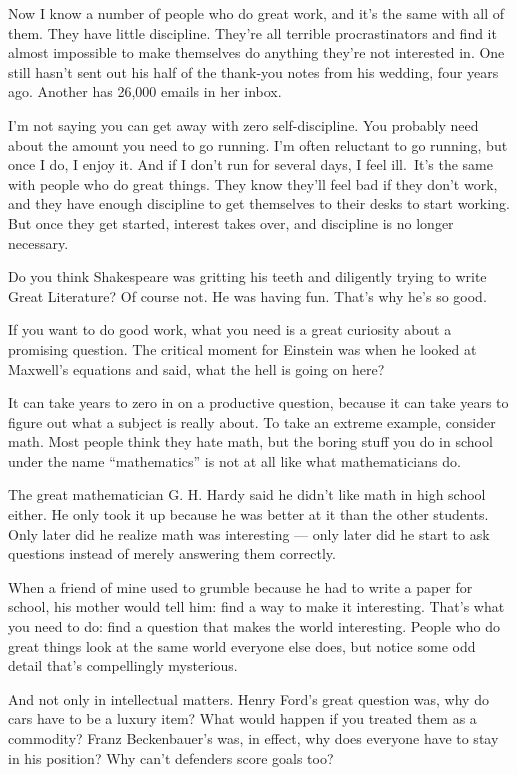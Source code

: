 Now I know a number of people who do great work, and it's the same with
all of them. They have little discipline. They're all terrible
procrastinators and find it almost impossible to make themselves do
anything they're not interested in. One still hasn't sent out his half
of the thank-you notes from his wedding, four years ago. Another has
26,000 emails in her inbox.

I'm not saying you can get away with zero self-discipline. You probably
need about the amount you need to go running. I'm often reluctant to go
running, but once I do, I enjoy it. And if I don't run for several days,
I feel ill.~It's the same with people who do great things. They know
they'll feel bad if they don't work, and they have enough discipline to
get themselves to their desks to start working. But once they get
started, interest takes over, and discipline is no longer necessary.

Do you think Shakespeare was gritting his teeth and diligently trying to
write Great Literature? Of course not. He was having fun. That's why
he's so good.

If you want to do good work, what you need is a great curiosity about a
promising question. The critical moment for Einstein was when he looked
at Maxwell's equations and said, what the hell is going on here?

It can take years to zero in on a productive question, because it can
take years to figure out what a subject is really about. To take an
extreme example, consider math. Most people think they hate math, but
the boring stuff you do in school under the name ``mathematics'' is not
at all like what mathematicians do.

The great mathematician G. H. Hardy said he didn't like math in high
school either. He only took it up because he was better at it than the
other students. Only later did he realize math was interesting --- only
later did he start to ask questions instead of merely answering them
correctly.

When a friend of mine used to grumble because he had to write a paper
for school, his mother would tell him: find a way to make it
interesting. That's what you need to do: find a question that makes the
world interesting. People who do great things look at the same world
everyone else does, but notice some odd detail that's compellingly
mysterious.

And not only in intellectual matters. Henry Ford's great question was,
why do cars have to be a luxury item? What would happen if you treated
them as a commodity? Franz Beckenbauer's was, in effect, why does
everyone have to stay in his position? Why can't defenders score goals
too?

